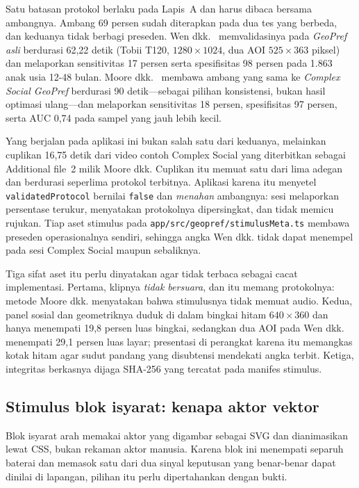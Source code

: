 \documentclass{article}
\begin{document}
Satu batasan protokol berlaku pada Lapis~A dan harus dibaca bersama ambangnya. Ambang 69
persen sudah diterapkan pada dua tes yang berbeda, dan keduanya tidak berbagi preseden.
Wen dkk.~\cite{wen2022} memvalidasinya pada \emph{GeoPref asli} berdurasi 62,22 detik
(Tobii T120, $1280 \times 1024$, dua AOI $525 \times 363$ piksel) dan melaporkan
sensitivitas 17 persen serta spesifisitas 98 persen pada 1.863 anak usia 12-48 bulan. Moore
dkk.~\cite{moore2018} membawa ambang yang sama ke \emph{Complex Social GeoPref} berdurasi
90 detik---sebagai pilihan konsistensi, bukan hasil optimasi ulang---dan melaporkan
sensitivitas 18 persen, spesifisitas 97 persen, serta AUC 0,74 pada sampel yang jauh lebih
kecil.

Yang berjalan pada aplikasi ini bukan salah satu dari keduanya, melainkan cuplikan 16,75
detik dari video contoh Complex Social yang diterbitkan sebagai Additional file~2 milik
Moore dkk. Cuplikan itu memuat satu dari lima adegan dan berdurasi seperlima protokol
terbitnya. Aplikasi karena itu menyetel \texttt{validatedProtocol} bernilai \texttt{false}
dan \emph{menahan} ambangnya: sesi melaporkan persentase terukur, menyatakan protokolnya
dipersingkat, dan tidak memicu rujukan. Tiap aset stimulus pada
\texttt{app/src/geopref/stimulusMeta.ts} membawa preseden operasionalnya sendiri, sehingga
angka Wen dkk. tidak dapat menempel pada sesi Complex Social maupun sebaliknya.

Tiga sifat aset itu perlu dinyatakan agar tidak terbaca sebagai cacat implementasi.
Pertama, klipnya \emph{tidak bersuara}, dan itu memang protokolnya: metode Moore dkk.
menyatakan bahwa stimulusnya tidak memuat audio. Kedua, panel sosial dan geometriknya
duduk di dalam bingkai hitam $640 \times 360$ dan hanya menempati 19,8 persen luas
bingkai, sedangkan dua AOI pada Wen dkk. menempati 29,1 persen luas layar; presentasi di
perangkat karena itu memangkas kotak hitam agar sudut pandang yang disubtensi mendekati
angka terbit. Ketiga, integritas berkasnya dijaga SHA-256 yang tercatat pada manifes
stimulus.

\subsection{Stimulus blok isyarat: kenapa aktor vektor}
\label{sec:aktor}

Blok isyarat arah memakai aktor yang digambar sebagai SVG dan dianimasikan lewat CSS,
bukan rekaman aktor manusia. Karena blok ini menempati separuh baterai dan memasok satu
dari dua sinyal keputusan yang benar-benar dapat dinilai di lapangan, pilihan itu perlu
dipertahankan dengan bukti.
\end{document}

